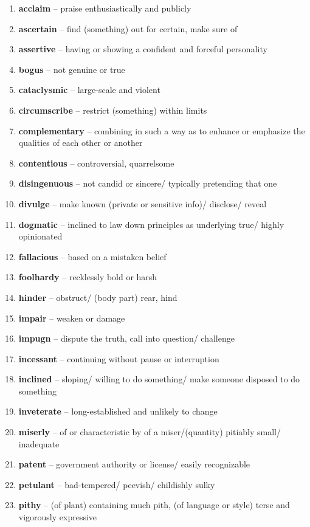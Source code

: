 \begin{enumerate}[wide,labelindent=0pt]
\item \textbf{acclaim} -- praise enthusiastically and publicly
\item \textbf{ascertain} -- find (something) out for certain, make sure of
\item \textbf{assertive} -- having or showing a confident and forceful personality
\item \textbf{bogus} -- not genuine or true
\item \textbf{cataclysmic} -- large-scale and violent
\item \textbf{circumscribe} -- restrict (something) within limits
\item \textbf{complementary} -- combining in such a way as to enhance or emphasize the qualities of each other or another
\item \textbf{contentious} -- controversial, quarrelsome
\item \textbf{disingenuous} -- not candid or sincere/ typically pretending that one
\item \textbf{divulge} -- make known (private or sensitive info)/ disclose/ reveal
\item \textbf{dogmatic} -- inclined to law down principles as underlying true/ highly opinionated
\item \textbf{fallacious} -- based on a mistaken belief
\item \textbf{foolhardy} -- recklessly bold or harsh
\item \textbf{hinder} -- obstruct/ (body part) rear, hind
\item \textbf{impair} -- weaken or damage
\item \textbf{impugn} -- dispute the truth, call into question/ challenge
\item \textbf{incessant} -- continuing without pause or interruption
\item \textbf{inclined} -- sloping/ willing to do something/ make someone disposed to do something
\item \textbf{inveterate} -- long-established and unlikely to change
\item \textbf{miserly} -- of or characteristic by of a miser/(quantity) pitiably small/ inadequate
\item \textbf{patent} -- government authority or license/ easily recognizable
\item \textbf{petulant} -- bad-tempered/ peevish/ childishly sulky
\item \textbf{pithy} -- (of plant) containing much pith, (of language or style) terse and vigorously expressive

\end{enumerate}
